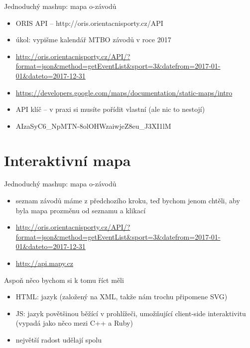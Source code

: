 \documentclass{beamer}
\begin{document}
\begin{frame}{Jednoduchý mashup: mapa o-závodů}
  \begin{itemize}
    \item ORIS API -- http://oris.orientacnisporty.cz/API
    \item úkol: vypišme kalendář MTBO závodů v roce 2017
    \item {\tiny \url{http://oris.orientacnisporty.cz/API/?format=json\&method=getEventList\&sport=3\&datefrom=2017-01-01\&dateto=2017-12-31}}
    \item {\tiny \url{https://developers.google.com/maps/documentation/static-maps/intro}}
    \item API klíč -- v praxi si musíte pořídit vlastní (ale nic to nestojí)
    \item AIzaSyC6\_NpMTN-8olOHWzaiwjeZ8eu\_J3XI1lM
  \end{itemize}
\end{frame}


\section{Interaktivní mapa}

\begin{frame}{Jednoduchý mashup: mapa o-závodů}
  \begin{itemize}
    \item seznam závodů máme z předchozího kroku, teď bychom jenom chtěli, aby byla mapa prozměnu od seznamu a klikací
    \item {\tiny \url{http://oris.orientacnisporty.cz/API/?format=json\&method=getEventList\&sport=3\&datefrom=2017-01-01\&dateto=2017-12-31}}
    \item {\tiny \url{http://api.mapy.cz}}
  \end{itemize}
\end{frame}

\begin{frame}{Aspoň něco bychom si k tomu říct měli}
  \begin{itemize}
    \item HTML: jazyk (založený na XML, takže nám trochu připomene SVG)
    \item JS: jazyk povětšinou běžící v prohlížeči, umožňující client-side interaktivitu (vypadá jako něco mezi C++ a Ruby)
    \item největší radost udělají spolu
  \end{itemize}
\end{frame}
\end{document}
